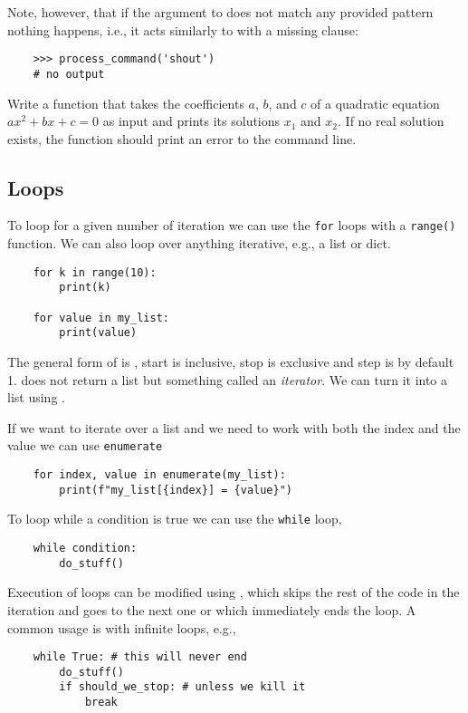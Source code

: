 Note, however, that if the argument to  does not match any provided pattern nothing happens, i.e., it acts similarly to  with a missing  clause:
\begin{lstlisting}
    >>> process_command('shout')
    # no output
\end{lstlisting}

\begin{exercise}
Write a function that takes the coefficients $a$, $b$, and $c$ of a quadratic equation $ax^2 + bx + c = 0$ as input and prints its solutions $x_1$ and $x_2$. 
If no real solution exists, the function should print an error to the command line.
\end{exercise}

\subsection{Loops}
To loop for a given number of iteration we can use the \verb|for| loops with a \verb|range()| function. We can also loop over anything iterative, e.g., a list or dict.
\begin{lstlisting}
    for k in range(10):
        print(k)

    for value in my_list:
        print(value) 
\end{lstlisting}
The general form of  is , start is inclusive, stop is exclusive and step is by default 1.  does not return a list but something called an \emph{iterator}. We can turn it into a list using .

If we want to iterate over a list and we need to work with both the index and the value we can use \lstinline{enumerate}
\begin{lstlisting}
    for index, value in enumerate(my_list):
        print(f"my_list[{index}] = {value}")
\end{lstlisting}

To loop while a condition is true we can use the \verb|while| loop,
\begin{lstlisting}
    while condition:
        do_stuff()
\end{lstlisting}

Execution of loops can be modified using , which skips the rest of the code in the iteration and goes to the next one or  which immediately ends the loop. A common usage is with infinite loops, e.g.,
\begin{lstlisting}
    while True: # this will never end
        do_stuff()
        if should_we_stop: # unless we kill it
            break
\end{lstlisting}

